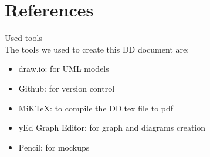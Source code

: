 \documentclass[12pt, letterpaper]{article}
\begin{document}
\newpage
\section{References}
Used tools \\
The tools we used to create this DD document are:
\begin{itemize}
	\item draw.io: for UML models
	\item Github: for version control
	\item MiKTeX: to compile the DD.tex file to pdf
	\item yEd Graph Editor: for graph and diagrams creation
	\item Pencil: for mockups
\end{itemize}
\end{document}
